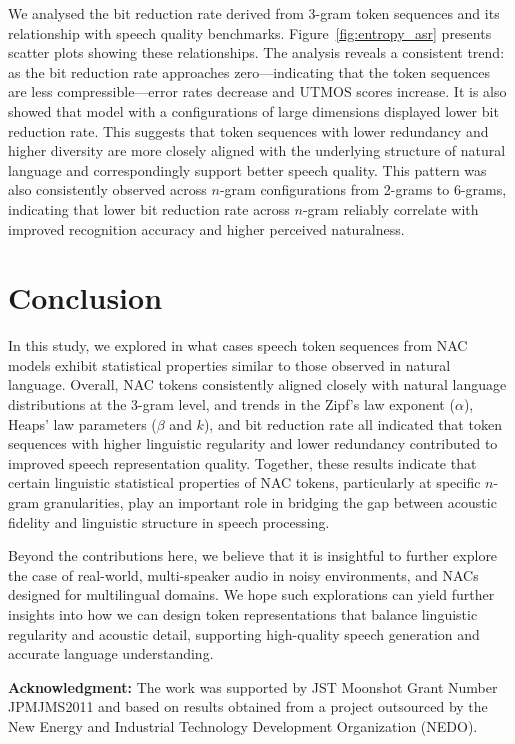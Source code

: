 \documentclass[conference]{IEEEtran}
\begin{document}
We analysed the bit reduction rate derived from 3-gram token sequences and its relationship with speech quality benchmarks. Figure~\ref{fig:entropy_asr} presents scatter plots showing these relationships. The analysis reveals a consistent trend: as the bit reduction rate approaches zero—indicating that the token sequences are less compressible—error rates decrease and UTMOS scores increase. It is also showed that model with a configurations of large dimensions displayed lower bit reduction rate. This suggests that token sequences with lower redundancy and higher diversity are more closely aligned with the underlying structure of natural language and correspondingly support better speech quality. This pattern was also consistently observed across $n$-gram configurations from 2-grams to 6-grams\footnotemark[\value{footnote}], indicating that lower bit reduction rate across $n$-gram reliably correlate with improved recognition accuracy and higher perceived naturalness. 

\vspace{-2mm}
\section{Conclusion}

In this study, we explored in what cases speech token sequences from NAC models exhibit statistical properties similar to those observed in natural language. Overall, NAC tokens consistently aligned closely with natural language distributions at the 3-gram level, and trends in the Zipf's law exponent ($\alpha$), Heaps' law parameters ($\beta$ and $k$), and bit reduction rate all indicated that token sequences with higher linguistic regularity and lower redundancy contributed to improved speech representation quality. Together, these results indicate that certain linguistic statistical properties of NAC tokens, particularly at specific $n$-gram granularities, play an important role in bridging the gap between acoustic fidelity and linguistic structure in speech processing. 

Beyond the contributions here, we believe that it is insightful to further explore the case of real-world, multi-speaker audio in noisy environments, and NACs designed for multilingual domains. We hope such explorations can yield further insights into how we can design token representations that balance linguistic regularity and acoustic detail, supporting high-quality speech generation and accurate language understanding.


\textbf{Acknowledgment:}
The work was supported by JST Moonshot Grant Number JPMJMS2011 and based on results obtained from a project outsourced by the New Energy and Industrial Technology Development Organization (NEDO).



\end{document}
